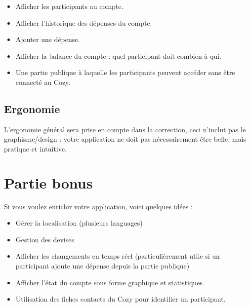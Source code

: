 \documentclass{42-fr}
\begin{document}
        \begin{itemize}\itemsep1pt
            \item Afficher les participants au compte.
            \item Afficher l'historique des d\'epenses du compte.
			\item Ajouter une d\'epense.
			\item Afficher la balance du compte : quel participant doit combien à qui.
	        \item Une partie publique \`a laquelle les participants peuvent acc\'eder sans
				\^etre connect\'e au Cozy.
        \end{itemize}


    \section{Ergonomie}

        L'ergonomie g\'en\'eral sera prise en compte dans la correction,
		ceci n'inclut pas le graphisme/design : votre application ne doit
		pas n\'ecessairement \^etre belle, mais pratique et intuitive.




\chapter{Partie bonus}

    Si vous voulez enrichir votre application, voici quelques id\'ees :\newline

    \begin{itemize}\itemsep1pt
		\item Gérer la localisation (plusieurs languages)
        \item Gestion des devises
		\item Afficher les changements en temps r\'eel (particuli\`erement utile si
			un participant ajoute une d\'epense depuis la partie publique)
		\item Afficher l'\'etat du compte sous forme graphique et statistiques.
		\item Utilisation des fiches contacts du Cozy pour identifier un participant.
    \end{itemize}
\end{document}
